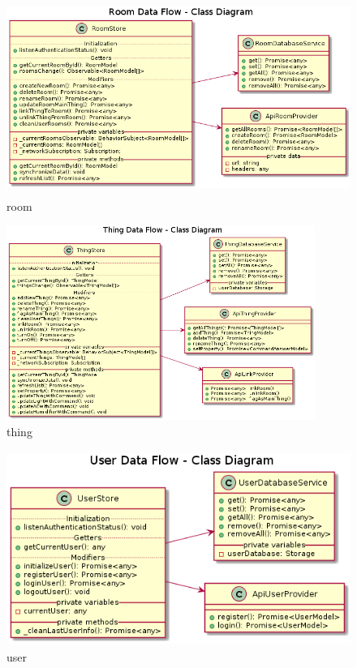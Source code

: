\begin{figure}[hbt!]
\centering
\includegraphics[height=2.5in]{figures/diagrams/front/data-flow/room.png}
\caption[room]{room\footnotemark}
\end{figure}

\begin{figure}[hbt!]
\centering
\includegraphics[height=2.5in]{figures/diagrams/front/data-flow/thing.png}
\caption[thing]{thing\footnotemark}
\end{figure}

\begin{figure}[hbt!]
\centering
\includegraphics[height=2.5in]{figures/diagrams/front/data-flow/user.png}
\caption[user]{user\footnotemark}
\end{figure}

